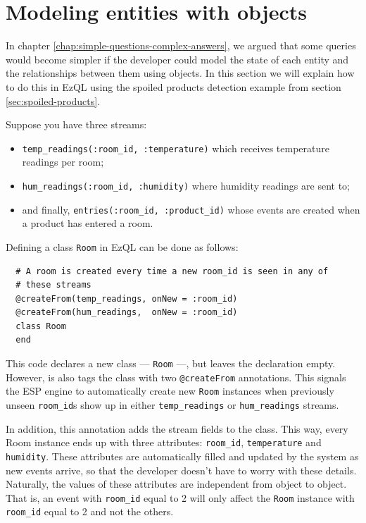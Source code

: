 \documentclass{report}
\begin{document}
\section{Modeling entities with objects}
\label{sec:objects}

In chapter \ref{chap:simple-questions-complex-answers}, we argued that
some queries would become simpler if the developer could model the
state of each entity and the relationships between them using
objects. In this section we will explain how to do this in EzQL using
the spoiled products detection example from section
\ref{sec:spoiled-products}.

Suppose you have three streams:

\begin{itemize}
\item \verb=temp_readings(:room_id, :temperature)= which receives
  temperature readings per room;
\item \verb=hum_readings(:room_id, :humidity)= where humidity readings
  are sent to;
\item and finally, \verb=entries(:room_id, :product_id)= whose events
  are created when a product has entered a room.
\end{itemize}

Defining a class \verb=Room= in EzQL can be done as follows:

\begin{lstlisting}
  # A room is created every time a new room_id is seen in any of
  # these streams
  @createFrom(temp_readings, onNew = :room_id)
  @createFrom(hum_readings,  onNew = :room_id)
  class Room
  end
\end{lstlisting}

This code declares a new class --- \verb=Room= ---, but leaves the
declaration empty. However, is also tags the class with two
\verb=@createFrom= annotations. This signals the ESP engine to
automatically create new \verb=Room= instances when previously unseen
\verb=room_id=s show up in either \verb=temp_readings= or
\verb=hum_readings= streams.

In addition, this annotation adds the stream fields to
the class. This way, every Room instance ends up with three
attributes: \verb=room_id=, \verb=temperature= and
\verb=humidity=. These attributes are automatically filled and updated
by the system as new events arrive, so that the developer doesn't have
to worry with these details. Naturally, the values of these attributes
are independent from object to object. That is, an event with
\verb=room_id= equal to 2 will only affect the \verb=Room= instance
with \verb=room_id= equal to 2 and not the others.
\end{document}
